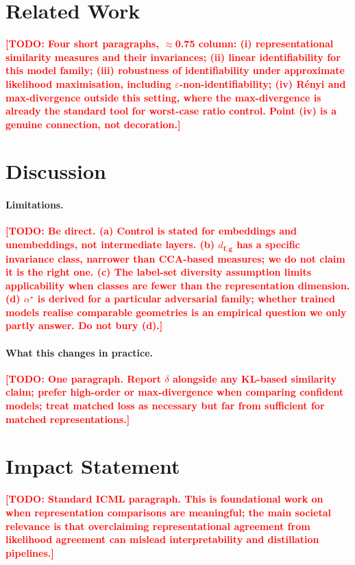\documentclass{article}
\newcommand{\TODO}[1]{\textcolor{red}{\textbf{[TODO: #1]}}}
\newcommand{\bff}{\mathbf{f}}
\newcommand{\bfg}{\mathbf{g}}
\newcommand{\dfg}{d_{\bff,\bfg}}
\theoremstyle{plain}
\theoremstyle{definition}
\theoremstyle{remark}
\begin{document}
\section{Related Work}
\label{sec:related}
\TODO{Four short paragraphs, $\approx$0.75 column: (i) representational
similarity measures and their invariances; (ii) linear identifiability for this
model family; (iii) robustness of identifiability under approximate likelihood
maximisation, including $\varepsilon$-non-identifiability; (iv) R\'enyi and
max-divergence outside this setting, where the max-divergence is already the
standard tool for worst-case ratio control. Point (iv) is a genuine connection,
not decoration.}

\section{Discussion}
\label{sec:discussion}

\paragraph{Limitations.}
\TODO{Be direct. (a) Control is stated for embeddings and unembeddings, not
intermediate layers. (b) $\dfg$ has a specific invariance class, narrower than
CCA-based measures; we do not claim it is the right one. (c) The label-set
diversity assumption limits applicability when classes are fewer than the
representation dimension. (d) $\alpha^{\star}$ is derived for a particular
adversarial family; whether trained models realise comparable geometries is an
empirical question we only partly answer. Do not bury (d).}

\paragraph{What this changes in practice.}
\TODO{One paragraph. Report $\delta$ alongside any KL-based similarity claim;
prefer high-order or max-divergence when comparing confident models; treat
matched loss as necessary but far from sufficient for matched representations.}

\section*{Impact Statement}
\TODO{Standard ICML paragraph. This is foundational work on when representation
comparisons are meaningful; the main societal relevance is that overclaiming
representational agreement from likelihood agreement can mislead
interpretability and distillation pipelines.}
\end{document}
